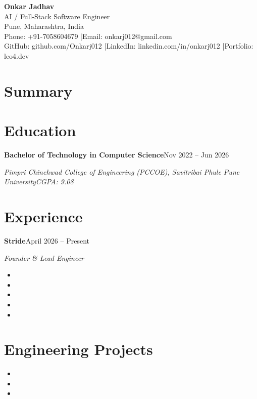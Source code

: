 \documentclass[a4paper,11pt]{article}
\newcommand{\entry}[2]{\noindent\textbf{#1}\hfill{#2}\par}
\newcommand{\subentry}[2]{\noindent\textit{#1}\hfill{\textit{#2}}\par\vspace{2pt}}
\begin{document}
\begin{center}
  {\LARGE \textbf{Onkar Jadhav}}\\[2pt]
  AI / Full-Stack Software Engineer\\[2pt]
  Pune, Maharashtra, India\\[2pt]
  Phone: +91-7058604679 \quad|\quad Email: onkarj012@gmail.com\\[2pt]
  GitHub: github.com/Onkarj012 \quad|\quad LinkedIn: linkedin.com/in/onkarj012 \quad|\quad Portfolio: leo4.dev
\end{center}

\section{Summary}

\section{Education}
\entry{Bachelor of Technology in Computer Science}{Nov 2022 -- Jun 2026}
\subentry{Pimpri Chinchwad College of Engineering (PCCOE), Savitribai Phule Pune University}{CGPA: 9.08}

\section{Experience}
\entry{Stride}{April 2026 -- Present}
\subentry{Founder \& Lead Engineer}{}
\begin{itemize}
  \item %
  \item %
  \item %
  \item %
  \item %
\end{itemize}

\section{Engineering Projects}

\entry{}{} %
\subentry{}{} %
\begin{itemize}
  \item %
  \item %
  \item %
\end{itemize}
\end{document}
